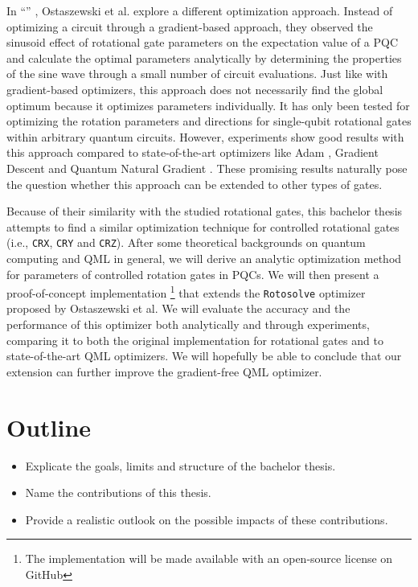 In ``\emph{}''
\cite{ostaszewski_structure_2021}, Ostaszewski et al. explore a different
optimization approach.
Instead of optimizing a circuit through a gradient-based approach, they observed
the sinusoid effect of rotational gate parameters on the expectation value of a
PQC and calculate the optimal parameters analytically by determining the
properties of the sine wave through a small number of circuit evaluations. 
Just like with gradient-based optimizers, this approach does not necessarily
find the global optimum because it optimizes parameters individually.
It has only been tested for optimizing the rotation parameters and directions
for single-qubit rotational gates within arbitrary quantum circuits.
However, experiments show good results with this approach compared to
state-of-the-art optimizers like Adam \cite{kingma_adam_2017},
Gradient Descent and Quantum Natural Gradient \cite{stokes_quantum_2020}.
These promising results naturally pose the question whether this approach can be
extended to other types of gates.

Because of their similarity with the studied rotational gates, this bachelor
thesis attempts to find a similar optimization technique for controlled
rotational gates (i.e., \texttt{CRX}, \texttt{CRY} and \texttt{CRZ}).
After some theoretical backgrounds on quantum computing and QML in general, we
will derive an analytic optimization method for parameters of controlled
rotation gates in PQCs.
We will then present a proof-of-concept implementation%
\footnote{The implementation will be made available with an open-source license
on GitHub}
that extends the \texttt{Rotosolve} optimizer proposed by Ostaszewski et al.
We will evaluate the accuracy and the performance of this optimizer both
analytically and through experiments, comparing it to both the original
implementation for rotational gates and to state-of-the-art QML optimizers.
We will hopefully be able to conclude that our extension can further improve the
gradient-free QML optimizer.

\section{Outline}
\begin{itemize}
    \item
        Explicate the goals, limits and structure of the bachelor thesis.
    \item
        Name the contributions of this thesis.
    \item
        Provide a realistic outlook on the possible impacts of these
        contributions.
\end{itemize}
